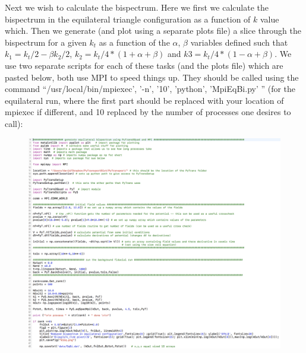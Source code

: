 \documentclass[10pt,
amsmath,amssymb,
aps,prd,nofootinbib,eqsecnum,a4paper]{revtex4}
\begin{document}
Next we wish to calculate the bispectrum. Here we first we calculate the bispectrum 
in the equilateral triangle configuration as a function of $k$ value which. Then 
we generate (and plot using a separate plots file) a slice through the bispectrum for a given 
$k_t$ as a function of the $\alpha$, $\beta$ variables defined such that $k_1 = k_t/2 - \beta  k_2/2$, 
$ k_2 = k_t/4*(1+\alpha+\beta)$ and $k3 = k_t/4*(1-\alpha+\beta)$. 
We use two separate scripts for each of these tasks (and the plots file) which are pasted below, 
both use MPI to speed 
things up. They should be called 
using the command ``/usr/local/bin/mpiexec', '-n', '10', 'python', 'MpiEqBi.py' '' 
 (for the equilateral run, where the first part 
should be replaced 
with your location of mpiexec if different, and 10 replaced by the number of processes one desires to call): 
\begin{figure}[H]
\centering
\includegraphics[width=18cm]{shot7b}
\end{figure}
\end{document}
